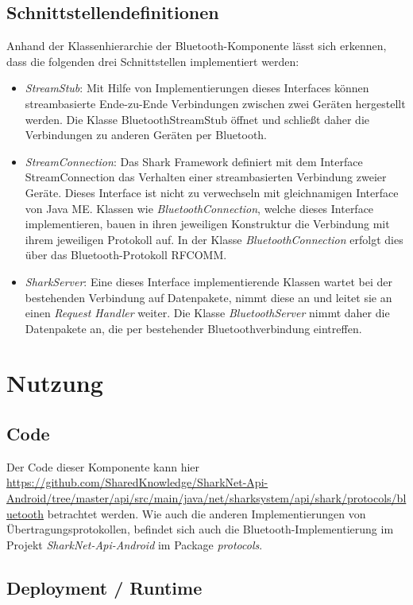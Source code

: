 \subsection{Schnittstellendefinitionen}\label{ch:bluetoothinterfaces}
Anhand der Klassenhierarchie der Bluetooth-Komponente lässt sich erkennen, dass die folgenden drei Schnittstellen implementiert werden:
\begin{itemize}
	\item \textit{StreamStub}: Mit Hilfe von Implementierungen dieses Interfaces können streambasierte Ende-zu-Ende Verbindungen zwischen zwei Geräten hergestellt werden. Die Klasse BluetoothStreamStub öffnet und schließt daher die Verbindungen zu anderen Geräten per Bluetooth.
	\item \textit{StreamConnection}: Das Shark Framework definiert mit dem Interface StreamConnection das Verhalten einer streambasierten Verbindung zweier Geräte. Dieses Interface ist nicht zu verwechseln mit gleichnamigen Interface von Java ME. Klassen wie \textit{BluetoothConnection}, welche dieses Interface implementieren, bauen in ihren jeweiligen Konstruktur die Verbindung mit ihrem jeweiligen Protokoll auf. In der Klasse \textit{BluetoothConnection} erfolgt dies über das Bluetooth-Protokoll RFCOMM.
	\item \textit{SharkServer}: Eine dieses Interface implementierende Klassen wartet bei der bestehenden Verbindung auf Datenpakete, nimmt diese an und leitet sie an einen \textit{Request Handler} weiter. Die Klasse \textit{BluetoothServer} nimmt daher die Datenpakete an, die per bestehender Bluetoothverbindung eintreffen.

\end{itemize}


\section{Nutzung}
\subsection{Code}
Der Code dieser Komponente kann hier \url{https://github.com/SharedKnowledge/SharkNet-Api-Android/tree/master/api/src/main/java/net/sharksystem/api/shark/protocols/bluetooth} betrachtet werden. Wie auch die anderen Implementierungen von Übertragungsprotokollen, befindet sich auch die Bluetooth-Implementierung im Projekt \textit{SharkNet-Api-Android} im Package \textit{protocols}. 

\subsection{Deployment / Runtime}



